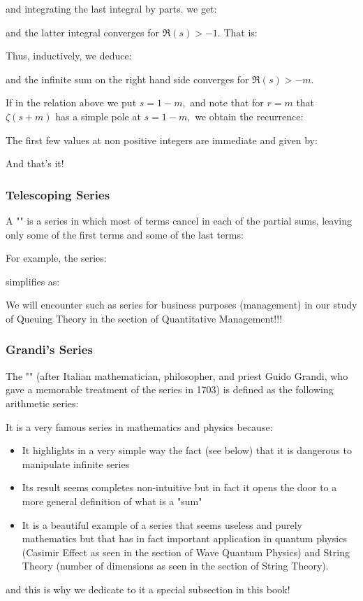 \begin{itemize}
		and integrating the last integral by parts. we get:
		
		and the latter integral converges for $\Re(s)>-1$. That is:
		
		Thus, inductively, we deduce:
		
		and the infinite sum on the right hand side converges for $\Re(s)>-m$. 
		
		If in the relation above we put $s=1-m,$ and note that for $r=m$ that $\zeta(s+m)$ has a simple pole at $s=1-m,$ we obtain the recurrence:
		
		The first few values at non positive integers are immediate and given by:
		
		And that's it!
	\end{itemize}
		
	\subsubsection{Telescoping Series}
	A "" is a series in which most of terms cancel in each of the partial sums, leaving only some of the first terms and some of the last terms:
	
	For example, the series:
	
	simplifies as:
	
	We will encounter such as series for business purposes (management) in our study of Queuing Theory in the section of Quantitative Management!!!
	
	\subsubsection{Grandi's Series}\label{Grandi series}
	The "" (after Italian mathematician, philosopher, and priest Guido Grandi, who gave a memorable treatment of the series in 1703) is defined as the following arithmetic series:
	
	It is a very famous series in mathematics and physics because:
	\begin{itemize}
		\item It highlights in a very simple way the fact (see below) that it is dangerous to manipulate infinite series
		
		\item Its result seems completes non-intuitive but in fact it opens the door to a more general definition of what is a "sum"
		
		\item It is a beautiful example of a series that seems useless and purely mathematics but that has in fact important application in quantum physics (Casimir Effect as seen in the section of Wave Quantum Physics) and String Theory (number of dimensions as seen in the section of String Theory).
	\end{itemize}
	and this is why we dedicate to it a special subsection in this book!
	
